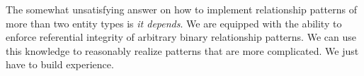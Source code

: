 The somewhat unsatisfying answer on how to implement relationship patterns of more than two entity types is \emph{it depends}.
We are equipped with the ability to enforce referential integrity of arbitrary binary relationship patterns.
We can use this knowledge to reasonably realize patterns that are more complicated.
We just have to build experience.%
\FloatBarrier%
\endhsection%
%
